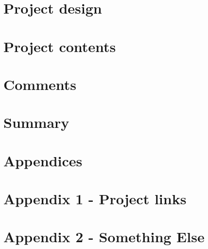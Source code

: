 \documentclass[12pt, a4paper]{report}
\begin{document}
    \chapter{Project design}\label{ch:project-design}
    

    \chapter{Project contents}\label{ch:project-contents}
    

    \chapter{Comments}\label{ch:comments}
    

    \chapter{Summary}\label{ch:summary}
    

    \pagebreak
    \printbibliography

    \pagebreak
    \appendix
    \chapter*{Appendices}
    \renewcommand{\thechapter}{\arabic{chapter}}

    \label{chapter:appendix-project-links}
    {\clearpage\relax\chapter*{Appendix 1 - Project links}}
    

    \clearpage
    \label{chapter:appendix-something-else}
    \chapter*{Appendix 2 - Something Else}
    
\end{document}

